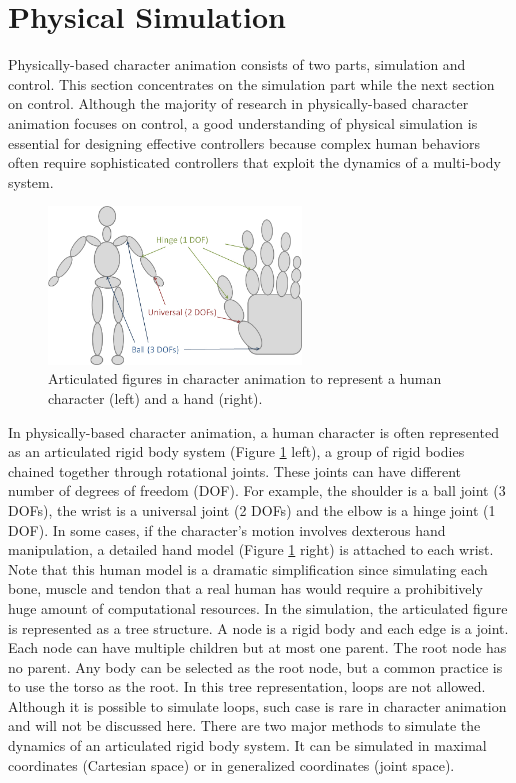 \section{Physical Simulation}

Physically-based character animation consists of two parts, simulation and control. This section concentrates on the simulation part while the next section on control. Although the majority of research in physically-based character animation focuses on control, a good understanding of physical simulation is essential for designing effective controllers because complex human behaviors often require sophisticated controllers that exploit the dynamics of a multi-body system.

\begin{figure}[h]
  \centering
  \includegraphics[width=0.6\textwidth]{figures/character.jpg}
  \caption{Articulated figures in character animation to represent a human character (left) and a hand (right).}
  \label{fig:character}
\end{figure}

In physically-based character animation, a human character is often represented as an articulated rigid body system (Figure \ref{fig:character} left), a group of rigid bodies chained together through rotational joints. These joints can have different number of degrees of freedom (DOF). For example, the shoulder is a ball joint (3 DOFs), the wrist is a universal joint (2 DOFs) and the elbow is a hinge joint (1 DOF). In some cases, if the character's motion involves dexterous hand manipulation, a detailed hand model (Figure \ref{fig:character} right) is attached to each wrist. Note that this human model is a dramatic simplification since simulating each bone, muscle and tendon that a real human has would require a prohibitively huge amount of computational resources. In the simulation, the articulated figure is represented as a tree structure. A node is a rigid body and each edge is a joint. Each node can have multiple children but at most one parent. The root node has no parent. Any body can be selected as the root node, but a common practice is to use the torso as the root. In this tree representation, loops are not allowed. Although it is possible to simulate loops, such case is rare in character animation and will not be discussed here. There are two major methods to simulate the dynamics of an articulated rigid body system. It can be simulated in maximal coordinates (Cartesian space) or in generalized coordinates (joint space).



